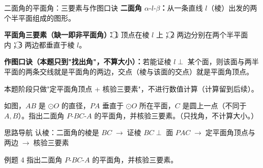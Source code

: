 \documentclass{exam-zh}
\begin{document}
\clearpage
{}


\begin{eduSolutionBox}{二面角的平面角：三要素与作图口诀}
  \begingroup
  \setlength{\parskip}{2.5mm}
\textbf{二面角 $\alpha\text{-}l\text{-}\beta$：}从一条直线 $l$（棱）出发的两个半平面组成的图形。\par
\textbf{平面角三要素（缺一即非平面角）：}\textcircled{1} 顶点在棱 $l$ 上；\textcircled{2} 两边分别在两个半平面内；\textcircled{3} 两边都垂直于棱 $l$。\par
\textbf{作图口诀（本题只到"找出角"，不算大小）：}若能证棱 $l\perp$ 某个面，则该面与两半平面的两条交线就是平面角的两边，交点（棱与该面的交点）就是平面角顶点。\par
本题阶段只做"定平面角顶点 + 核验三要素"，不进行数值计算（计算留到后续）。\par
  \endgroup
\end{eduSolutionBox}




\begin{eduProblemBlock}[例题 4]
如图，$AB$ 是 $\odot O$ 的直径，$PA$ 垂直于 $\odot O$ 所在平面，$C$ 是圆上一点（不同于 $A,B$）。指出二面角 $P\text{-}BC\text{-}A$ 的平面角，并核验三要素。（只找角，不计算大小。）

\end{eduProblemBlock}





\begin{eduAuxItem}{思路导航}
认棱：二面角的棱是 $BC$$\;\to\;$证棱 $BC\perp$ 面 $PAC$$\;\to\;$定平面角顶点与两边$\;\to\;$核验三要素\end{eduAuxItem}




\begin{eduSubQuestionItem}{例题 4}
指出二面角 $P\text{-}BC\text{-}A$ 的平面角，并核验三要素。\end{eduSubQuestionItem}
\end{document}
